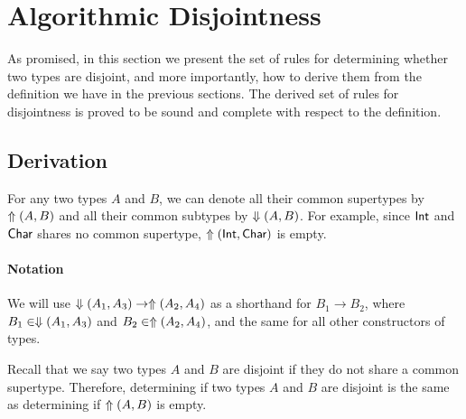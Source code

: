 \section{Algorithmic Disjointness}

As promised, in this section we present the set of rules for determining whether
two types are disjoint, and more importantly, how to derive them from the
definition we have in the previous sections. The derived set of rules for
disjointness is proved to be sound and complete with respect to the definition.

\subsection{Derivation}

For any two types $A$ and $B$, we can denote all their common
supertypes by $\Uparrow(A,B)$ and all their common subtypes by
$\Downarrow(A,B)$. For example, since $\textsf{Int}$ and $\textsf{Char}$ shares no common
supertype,  $\Uparrow(\textsf{Int},\textsf{Char})$ is empty.

\paragraph{Notation} We will use $\Downarrow(A_1,A_3) \to \Uparrow(A_2,A_4)$
as a shorthand for $B_1 \to B_2$, where $B_1 \in \Downarrow(A_1,A_3)$ and $B_2
\in \Uparrow(A_2,A_4)$, and the same for all other constructors of types.

Recall that we say two types $A$ and $B$ are disjoint if they do not share a
common supertype. Therefore, determining if two types $A$ and $B$ are disjoint
is the same as determining if $\Uparrow(A,B)$ is empty.

